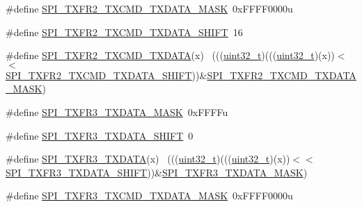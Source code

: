 \begin{DoxyCompactItemize}
\item 
\#define \hyperlink{group___s_p_i___register___masks_ga7b74d7b06c2d79ce4f3f5171e63a66f6}{S\+P\+I\+\_\+\+T\+X\+F\+R2\+\_\+\+T\+X\+C\+M\+D\+\_\+\+T\+X\+D\+A\+T\+A\+\_\+\+M\+A\+SK}~0x\+F\+F\+F\+F0000u
\item 
\#define \hyperlink{group___s_p_i___register___masks_ga8093c55dfe44be309ef0286209361f0e}{S\+P\+I\+\_\+\+T\+X\+F\+R2\+\_\+\+T\+X\+C\+M\+D\+\_\+\+T\+X\+D\+A\+T\+A\+\_\+\+S\+H\+I\+FT}~16
\item 
\#define \hyperlink{group___s_p_i___register___masks_gaa913b618de5d0a87c2a47f04b2bfb1ac}{S\+P\+I\+\_\+\+T\+X\+F\+R2\+\_\+\+T\+X\+C\+M\+D\+\_\+\+T\+X\+D\+A\+TA}(x)                            ~(((\hyperlink{_p_e___types_8h_a33594304e786b158f3fb30289278f5af}{uint32\+\_\+t})(((\hyperlink{_p_e___types_8h_a33594304e786b158f3fb30289278f5af}{uint32\+\_\+t})(x))$<$$<$\hyperlink{group___s_p_i___register___masks_ga8093c55dfe44be309ef0286209361f0e}{S\+P\+I\+\_\+\+T\+X\+F\+R2\+\_\+\+T\+X\+C\+M\+D\+\_\+\+T\+X\+D\+A\+T\+A\+\_\+\+S\+H\+I\+FT}))\&\hyperlink{group___s_p_i___register___masks_ga7b74d7b06c2d79ce4f3f5171e63a66f6}{S\+P\+I\+\_\+\+T\+X\+F\+R2\+\_\+\+T\+X\+C\+M\+D\+\_\+\+T\+X\+D\+A\+T\+A\+\_\+\+M\+A\+SK})
\item 
\#define \hyperlink{group___s_p_i___register___masks_gac55f871f2a4bd1462049674e1b69d771}{S\+P\+I\+\_\+\+T\+X\+F\+R3\+\_\+\+T\+X\+D\+A\+T\+A\+\_\+\+M\+A\+SK}~0x\+F\+F\+F\+Fu
\item 
\#define \hyperlink{group___s_p_i___register___masks_ga13d115127f0f26ef2f4afac9d4fcafd9}{S\+P\+I\+\_\+\+T\+X\+F\+R3\+\_\+\+T\+X\+D\+A\+T\+A\+\_\+\+S\+H\+I\+FT}~0
\item 
\#define \hyperlink{group___s_p_i___register___masks_gad37d45ef297944f9a4d87551d7b31a4c}{S\+P\+I\+\_\+\+T\+X\+F\+R3\+\_\+\+T\+X\+D\+A\+TA}(x)                                        ~(((\hyperlink{_p_e___types_8h_a33594304e786b158f3fb30289278f5af}{uint32\+\_\+t})(((\hyperlink{_p_e___types_8h_a33594304e786b158f3fb30289278f5af}{uint32\+\_\+t})(x))$<$$<$\hyperlink{group___s_p_i___register___masks_ga13d115127f0f26ef2f4afac9d4fcafd9}{S\+P\+I\+\_\+\+T\+X\+F\+R3\+\_\+\+T\+X\+D\+A\+T\+A\+\_\+\+S\+H\+I\+FT}))\&\hyperlink{group___s_p_i___register___masks_gac55f871f2a4bd1462049674e1b69d771}{S\+P\+I\+\_\+\+T\+X\+F\+R3\+\_\+\+T\+X\+D\+A\+T\+A\+\_\+\+M\+A\+SK})
\item 
\#define \hyperlink{group___s_p_i___register___masks_ga5db2d61f529d80173f78729f46c098a9}{S\+P\+I\+\_\+\+T\+X\+F\+R3\+\_\+\+T\+X\+C\+M\+D\+\_\+\+T\+X\+D\+A\+T\+A\+\_\+\+M\+A\+SK}~0x\+F\+F\+F\+F0000u

\end{DoxyCompactItemize}
